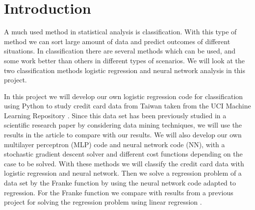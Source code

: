 \documentclass[12pt,a4paper,english]{article}
\begin{document}
\section{Introduction}
\label{sect:Intro}
A much used method in statistical analysis is classification. With this type of method we can sort large amount of data and predict outcomes of different situations. In classification there are several methods which can be used, and some work better than others in different types of scenarios. We will look at the two classification methods logistic regression and neural network analysis in this project.

In this project we will develop our own logistic regression code for classification using Python to study credit card data from Taiwan taken from the UCI Machine Learning Repository \cite{UCI}. Since this data set has been previously studied in a scientific research paper by \citet{origarticle} considering data mining techniques, we will use the results in the article to compare with our results. We will also develop our own multilayer perceptron (MLP) code and neural network code (NN), with a stochastic gradient descent solver and different cost functions depending on the case to be solved. With these methods we will classify the credit card data with logistic regression and neural network. Then we solve a regression problem of a data set by the Franke function by using the neural network code adapted to regression. For the Franke function we compare with results from a previous project for solving the regression problem using linear regression \cite{proj1}.
\end{document}
